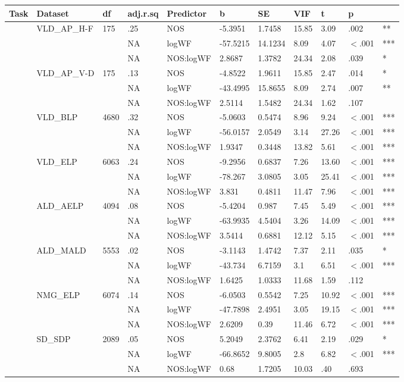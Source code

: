 \begin{table}[ht]
\centering
\begingroup\normalsize
\begin{tabular}{lllllllllll}
  \hline
Task & Dataset & df & adj.r.sq & Predictor & b & SE & VIF & t & p &  \\ 
  \hline
 & VLD\_AP\_H-F & 175 & .25 & NOS & -5.3951 & 1.7458 & 15.85 & 3.09 & .002 & ** \\ 
   &  &  & NA & logWF & -57.5215 & 14.1234 & 8.09 & 4.07 & $<$.001 & *** \\ 
   &  &  & NA & NOS:logWF & 2.8687 & 1.3782 & 24.34 & 2.08 & .039 & * \\ 
   & VLD\_AP\_V-D & 175 & .13 & NOS & -4.8522 & 1.9611 & 15.85 & 2.47 & .014 & * \\ 
   &  &  & NA & logWF & -43.4995 & 15.8655 & 8.09 & 2.74 & .007 & ** \\ 
   &  &  & NA & NOS:logWF & 2.5114 & 1.5482 & 24.34 & 1.62 & .107 &   \\ 
   & VLD\_BLP & 4680 & .32 & NOS & -5.0603 & 0.5474 & 8.96 & 9.24 & $<$.001 & *** \\ 
   &  &  & NA & logWF & -56.0157 & 2.0549 & 3.14 & 27.26 & $<$.001 & *** \\ 
   &  &  & NA & NOS:logWF & 1.9347 & 0.3448 & 13.82 & 5.61 & $<$.001 & *** \\ 
   & VLD\_ELP & 6063 & .24 & NOS & -9.2956 & 0.6837 & 7.26 & 13.60 & $<$.001 & *** \\ 
   &  &  & NA & logWF & -78.267 & 3.0805 & 3.05 & 25.41 & $<$.001 & *** \\ 
   &  &  & NA & NOS:logWF & 3.831 & 0.4811 & 11.47 & 7.96 & $<$.001 & *** \\ 
   & ALD\_AELP & 4094 & .08 & NOS & -5.4204 & 0.987 & 7.45 & 5.49 & $<$.001 & *** \\ 
   &  &  & NA & logWF & -63.9935 & 4.5404 & 3.26 & 14.09 & $<$.001 & *** \\ 
   &  &  & NA & NOS:logWF & 3.5414 & 0.6881 & 12.12 & 5.15 & $<$.001 & *** \\ 
   & ALD\_MALD & 5553 & .02 & NOS & -3.1143 & 1.4742 & 7.37 & 2.11 & .035 & * \\ 
   &  &  & NA & logWF & -43.734 & 6.7159 & 3.1 & 6.51 & $<$.001 & *** \\ 
   &  &  & NA & NOS:logWF & 1.6425 & 1.0333 & 11.68 & 1.59 & .112 &   \\ 
   & NMG\_ELP & 6074 & .14 & NOS & -6.0503 & 0.5542 & 7.25 & 10.92 & $<$.001 & *** \\ 
   &  &  & NA & logWF & -47.7898 & 2.4951 & 3.05 & 19.15 & $<$.001 & *** \\ 
   &  &  & NA & NOS:logWF & 2.6209 & 0.39 & 11.46 & 6.72 & $<$.001 & *** \\ 
   & SD\_SDP & 2089 & .05 & NOS & 5.2049 & 2.3762 & 6.41 & 2.19 & .029 & * \\ 
   &  &  & NA & logWF & -66.8652 & 9.8005 & 2.8 & 6.82 & $<$.001 & *** \\ 
   &  &  & NA & NOS:logWF & 0.68 & 1.7205 & 10.03 & .40 & .693 &   \\ 
   \hline
\end{tabular}
\endgroup
\end{table}
